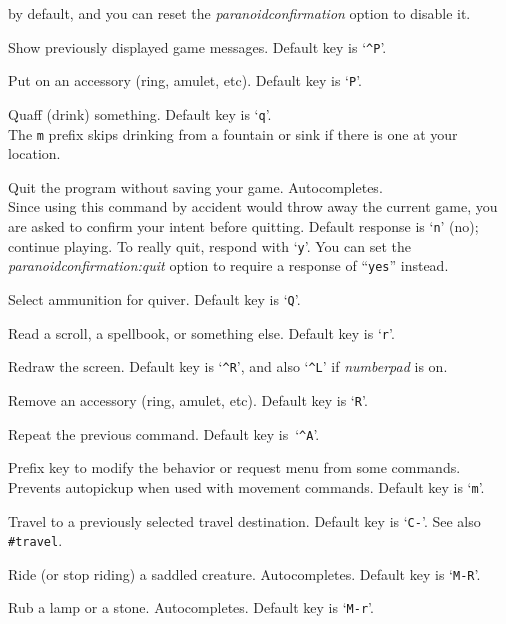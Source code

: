\documentclass[titlepage]{article}
\begin{document}
\begin{description}[font=\mdseries\ttfamily]
by default, and you can reset the
\textit{paranoid\textunderscore confirmation}
option to disable it.
\item[\#prevmsg]
Show previously displayed game messages. Default key is `\texttt{\textasciicircum P}'.
\item[\#puton]
Put on an accessory (ring, amulet, etc). Default key is `\texttt{P}'.
\item[\#quaff]
Quaff (drink) something. Default key is `\texttt{q}'.\\
The \texttt{m} prefix skips drinking from a fountain or sink if there
is one at your location.
\item[\#quit]
Quit the program without saving your game. Autocompletes.\\
Since using this command by accident would throw away the current game,
you are asked to confirm your intent before quitting.
Default response is `\texttt{n}' (no); continue playing.
To really quit, respond with `\texttt{y}'.
You can set the
\textit{paranoid\textunderscore confirmation:quit}
option to require a response of ``\texttt{yes}'' instead.
\item[\#quiver]
Select ammunition for quiver. Default key is `\texttt{Q}'.
\item[\#read]
Read a scroll, a spellbook, or something else. Default key is `\texttt{r}'.
\item[\#redraw]
Redraw the screen.
Default key is `\texttt{\textasciicircum R}',
and also `\texttt{\textasciicircum L}' if \textit{number\textunderscore pad} is on.
\item[\#remove]
Remove an accessory (ring, amulet, etc). Default key is `\texttt{R}'.
\item[\#repeat]
Repeat the previous command.
Default key is~`\texttt{\textasciicircum A}'.
\item[\#reqmenu]
Prefix key to modify the behavior or request menu from some commands.
Prevents autopickup when used with movement commands.
Default key is `\texttt{m}'.
\item[\#retravel]
Travel to a previously selected travel destination.
Default key is `\texttt{C-\textunderscore }'.
See also \texttt{\#travel}.
\item[\#ride]
Ride (or stop riding) a saddled creature. Autocompletes.
Default key is `\texttt{M-R}'.
\item[\#rub]
Rub a lamp or a stone. Autocompletes. Default key is `\texttt{M-r}'.
\item[\#run]

\end{description}
\end{document}

